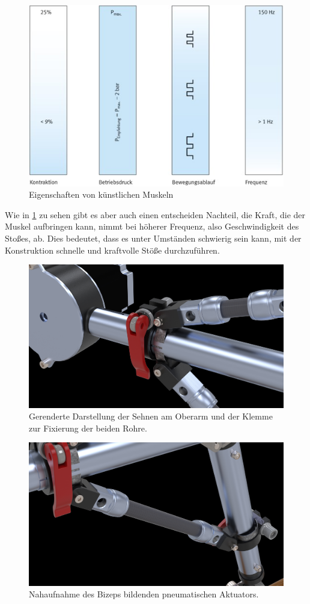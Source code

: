 		\begin{figure}[h]
			\centering
			\includegraphics[width=.75\textwidth]{Abb/EigenschaftenkuenstlMuskel.jpg}
			\caption{Eigenschaften von künstlichen Muskeln}
			\label{fig:EigenschaftenkuenstlMuskel}
		\end{figure}

		Wie in \cref{fig:EigenschaftenkuenstlMuskel} zu sehen gibt es aber auch einen entscheiden Nachteil, die Kraft, die der Muskel aufbringen kann, nimmt bei höherer Frequenz, also Geschwindigkeit des Stoßes, ab.
		Dies bedeutet, dass es unter Umständen schwierig sein kann, mit der Konstruktion schnelle und kraftvolle Stöße durchzuführen.

		\begin{figure}[h]
			\centering
			\includegraphics[width=\textwidth]{Abb/CAD/Renderings/sehnen_und_schelle.jpg}
			\caption[Gerenderte Darstellung der Sehnen und Sattelklemme]{Gerenderte Darstellung der Sehnen am Oberarm und der Klemme zur Fixierung der beiden Rohre.}%
			\label{fig:rendering sehnen und schellen}
		\end{figure}

		\begin{figure}[h]
			\centering
			\includegraphics[width=\textwidth]{Abb/CAD/Renderings/bizeps.jpg}
			\caption[Nahaufnahme des Bizeps bildenden pneumatischen Aktuators]{Nahaufnahme des Bizeps bildenden pneumatischen Aktuators.}%
			\label{fig:rendering bizeps}
		\end{figure}